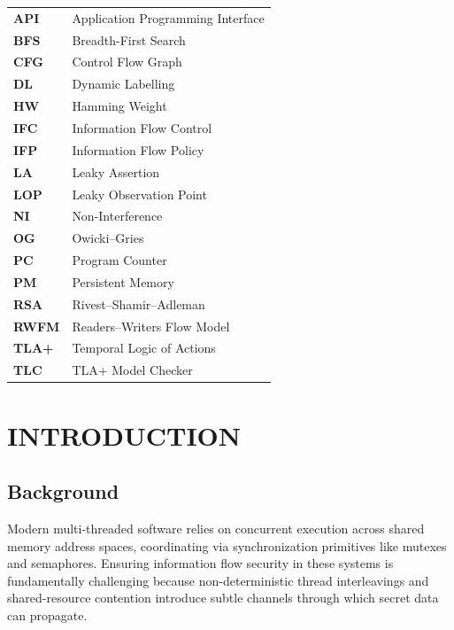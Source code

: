 \documentclass[a4paper,12pt]{report}
\renewcommand{\cftchapdotsep}{\cftnodots} %
\begin{document}
    \noindent
    \begin{tabularx}{\textwidth}{@{} p{2.8cm} X @{}}
        \textbf{API}   & Application Programming Interface \\
        \textbf{BFS}   & Breadth-First Search \\
        \textbf{CFG}   & Control Flow Graph \\
        \textbf{DL}    & Dynamic Labelling \\
        \textbf{HW}    & Hamming Weight \\
        \textbf{IFC}   & Information Flow Control \\
        \textbf{IFP}   & Information Flow Policy \\
        \textbf{LA}    & Leaky Assertion \\
        \textbf{LOP}   & Leaky Observation Point \\
        \textbf{NI}    & Non-Interference \\
        \textbf{OG}    & Owicki--Gries \\
        \textbf{PC}    & Program Counter \\
        \textbf{PM}    & Persistent Memory \\
        \textbf{RSA}   & Rivest--Shamir--Adleman \\
        \textbf{RWFM}  & Readers--Writers Flow Model \\
        \textbf{TLA+}  & Temporal Logic of Actions \\
        \textbf{TLC}   & TLA+ Model Checker \\
    \end{tabularx}
\endgroup

\addtocontents{toc}{\protect\renewcommand{\protect\cftchapdotsep}{\cftdotsep}}
\clearpage
{}
\setcounter{page}{1}
\pagestyle{plain}
\onehalfspacing

\chapter{INTRODUCTION}
\enlargethispage{1.5\baselineskip}

\section{Background}
Modern multi-threaded software relies on concurrent execution across shared memory address spaces, coordinating via synchronization primitives like mutexes and semaphores. Ensuring information flow security in these systems is fundamentally challenging because non-deterministic thread interleavings and shared-resource contention introduce subtle channels through which secret data can propagate.
\end{document}
